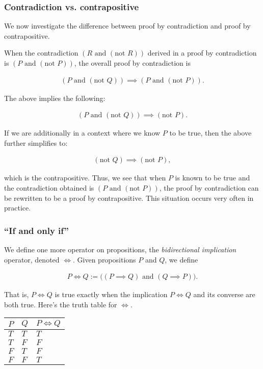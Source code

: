 \subsubsection*{Contradiction vs. contrapositive}

We now investigate the difference between proof by contradiction and proof by contrapositive. 

When the contradiction $(R \text{ and } (\text{not } R))$ derived in a proof by contradiction is $(P \text{ and } (\text{not } P))$, the overall proof by contradiction is

\begin{align*}
    (P \text{ and } (\text{not } Q)) \implies (P \text{ and } (\text{not } P)).
\end{align*}

The above implies the following:

\begin{align*}
    (P \text{ and } (\text{not } Q)) \implies (\text{not } P).
\end{align*}

If we are additionally in a context where we know $P$ to be true, then the above further simplifies to:

\begin{align*}
    (\text{not } Q) \implies (\text{not } P),
\end{align*}

which is the contrapositive. Thus, we see that when $P$ is known to be true and the contradiction obtained is $(P \text{ and } (\text{not } P))$, the proof by contradiction can be rewritten to be a proof by contrapositive. This situation occurs very often in practice.

\subsubsection*{``If and only if''}

We define one more operator on propositions, the \textit{bidirectional implication} operator, denoted $\iff$. Given propositions $P$ and $Q$, we define

\begin{align*}
    P \iff Q := \Big( (P \implies Q) \text{ and } (Q \implies P) \Big).
\end{align*}

That is, $P \iff Q$ is true exactly when the implication $P \iff Q$ and its converse are both true. Here's the truth table for $\iff$.

\begin{table}[H]
    \centering
    \begin{tabular}{|l|l|l|}
    \hline
    $P$ & $Q$ & $P \iff Q$ \\ \hline
    $T$ & $T$ & $T$        \\ \hline
    $T$ & $F$ & $F$        \\ \hline
    $F$ & $T$ & $F$        \\ \hline
    $F$ & $F$ & $T$        \\ \hline
    \end{tabular}
\end{table}


